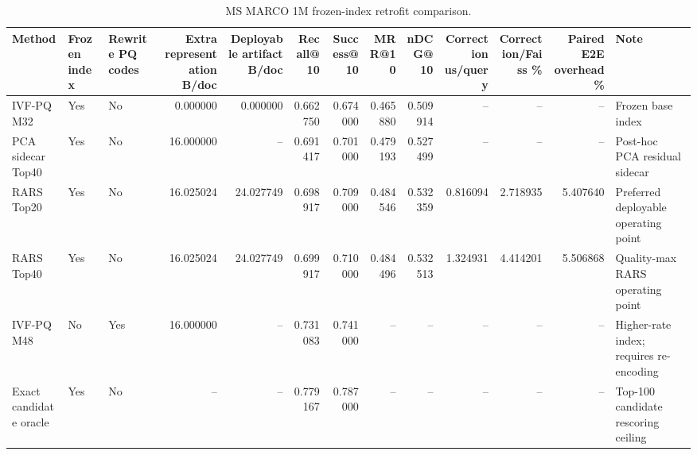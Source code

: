 \begin{table}[t]
\caption{MS MARCO 1M frozen-index retrofit comparison.}
\label{tab:rars-main}
\begin{tabular}{lllrrrrrrrrrl}
\toprule
Method & Frozen index & Rewrite PQ codes & Extra representation B/doc & Deployable artifact B/doc & Recall@10 & Success@10 & MRR@10 & nDCG@10 & Correction us/query & Correction/Faiss \% & Paired E2E overhead \% & Note \\
\midrule
IVF-PQ M32 & Yes & No & 0.000000 & 0.000000 & 0.662750 & 0.674000 & 0.465880 & 0.509914 & -- & -- & -- & Frozen base index \\
PCA sidecar Top40 & Yes & No & 16.000000 & -- & 0.691417 & 0.701000 & 0.479193 & 0.527499 & -- & -- & -- & Post-hoc PCA residual sidecar \\
RARS Top20 & Yes & No & 16.025024 & 24.027749 & 0.698917 & 0.709000 & 0.484546 & 0.532359 & 0.816094 & 2.718935 & 5.407640 & Preferred deployable operating point \\
RARS Top40 & Yes & No & 16.025024 & 24.027749 & 0.699917 & 0.710000 & 0.484496 & 0.532513 & 1.324931 & 4.414201 & 5.506868 & Quality-max RARS operating point \\
IVF-PQ M48 & No & Yes & 16.000000 & -- & 0.731083 & 0.741000 & -- & -- & -- & -- & -- & Higher-rate index; requires re-encoding \\
Exact candidate oracle & Yes & No & -- & -- & 0.779167 & 0.787000 & -- & -- & -- & -- & -- & Top-100 candidate rescoring ceiling \\
\bottomrule
\end{tabular}
\end{table}
